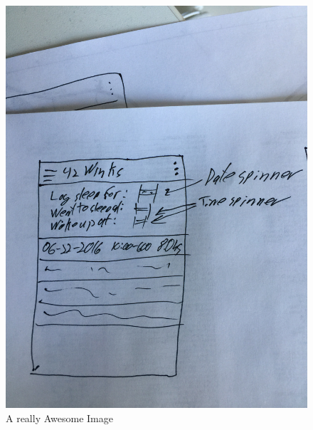 \documentclass[twoside, letterpaper, american]{article}
\begin{document}
\begin{figure}[!htb]
  \includegraphics[width=\linewidth]{images/log.JPG}
  \caption{A really Awesome Image}\label{fig:log}
\endminipage\hfill

\end{figure}
\end{document}

